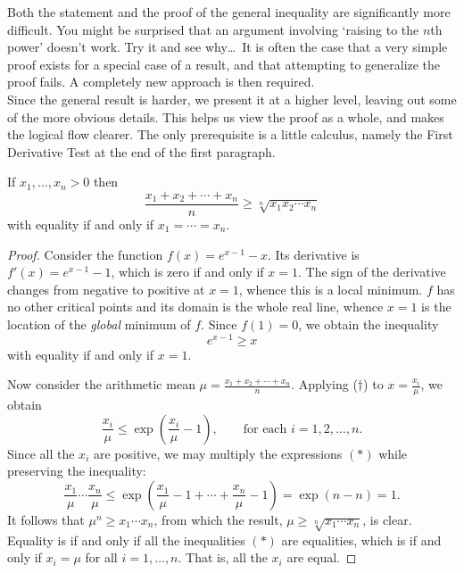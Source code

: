 
Both the statement and the proof of the general inequality are significantly more difficult. You might be surprised that an argument involving `raising to the $n$th power' doesn't work. Try it and see why\ldots\ It is often the case that a very simple proof exists for a special case of a result, and that attempting to generalize the proof fails. A completely new approach is then required.\\
Since the general result is harder, we present it at a higher level, leaving out some of the more obvious details. This helps us view the proof as a whole, and makes the logical flow clearer. The only prerequisite is a little calculus, namely the First Derivative Test at the end of the first paragraph.

\begin{thm}{}{}
If $x_1,\ldots,x_n>0$ then
\[\frac{x_1+x_2+\cdots+x_n}n\ge\sqrt[n]{x_1x_2\cdots x_n}\]
with equality if and only if $x_1=\cdots =x_n$.
\end{thm}

\begin{proof}
Consider the function $f(x)=e^{x-1}-x$. Its derivative is $f'(x)=e^{x-1}-1$, which is zero if and only if $x=1$. The sign of the derivative changes from negative to positive at $x=1$, whence this is a local minimum. $f$ has no other critical points and its domain is the whole real line, whence $x=1$ is the location of the \emph{global} minimum of $f$. Since $f(1)=0$, we obtain the inequality
\[e^{x-1}\ge x\tag*{($\dag$)}\]
with equality if and only if $x=1$.

 Now consider the arithmetic mean $\mu=\frac{x_1+x_2+\cdots +x_n}{n}$. Applying ($\dag$) to $x=\frac{x_i}\mu$, we obtain
\[\frac{x_i}\mu\le\exp\left(\frac{x_i}\mu-1\right),\qquad\text{for each $i=1,2,\ldots,n$.}\tag*{($\ast$)}\]
Since all the $x_i$ are positive, we may multiply the expressions $(\ast)$ while preserving the inequality:
\[\frac{x_1}\mu\cdots\frac{x_n}\mu\le\exp\left(\frac{x_1}{\mu}-1+\cdots+\frac{x_n}{\mu}-1\right)=\exp(n-n)=1.\]
It follows that $\mu^n\ge x_1\cdots x_n$, from which the result, $\mu\ge\sqrt[n]{x_1\cdots x_n}$, is clear.\\
Equality is if and only if all the inequalities $(\ast)$ are equalities, which is if and only if $x_i=\mu$ for all $i=1,\ldots,n$. That is, all the $x_i$ are equal.
\end{proof}


